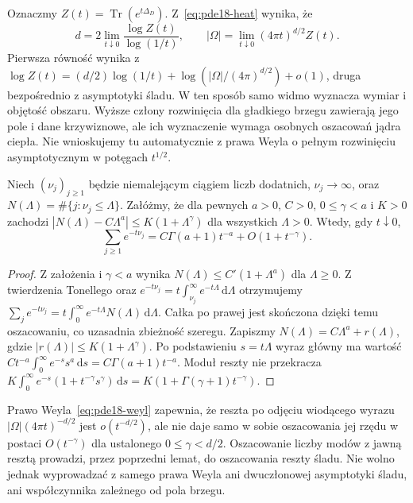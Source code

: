 \begin{uwaga}
Oznaczmy $Z(t)=\operatorname{Tr}(e^{t\Delta_D})$.
Z~\eqref{eq:pde18-heat} wynika, że
\[
 d=2\lim_{t\downarrow0}\frac{\log Z(t)}{\log(1/t)},
 \qquad
 |\Omega|=\lim_{t\downarrow0}(4\pi t)^{d/2}Z(t).
\]
Pierwsza równość wynika z
$\log Z(t)=(d/2)\log(1/t)+
\log(|\Omega|/(4\pi)^{d/2})+o(1)$,
druga bezpośrednio z asymptotyki śladu.
W ten sposób samo widmo wyznacza wymiar i objętość obszaru. Wyższe człony rozwinięcia dla gładkiego
brzegu zawierają jego pole i dane krzywiznowe, ale ich
wyznaczenie wymaga osobnych oszacowań jądra ciepła.
Nie wnioskujemy tu automatycznie z prawa Weyla o pełnym
rozwinięciu asymptotycznym w potęgach $t^{1/2}$.
\end{uwaga}


\begin{lemat}
\label{lem:pde18-abel}
Niech $(\nu_j)_{j\ge1}$ będzie niemalejącym ciągiem
liczb dodatnich, $\nu_j\to\infty$, oraz
$N(\Lambda)=\#\{j:\nu_j\le\Lambda\}$. Załóżmy, że dla
pewnych $a>0$, $C>0$, $0\le\gamma<a$ i $K>0$ zachodzi
$|N(\Lambda)-C\Lambda^a|\le K(1+\Lambda^\gamma)$
dla wszystkich $\Lambda>0$. Wtedy, gdy $t\downarrow0$,
\[
 \sum_{j\ge1}e^{-t\nu_j}
 =C\Gamma(a+1)t^{-a}+O(1+t^{-\gamma}).
\]
\end{lemat}
\begin{proof}
Z założenia i $\gamma<a$ wynika
$N(\Lambda)\le C'(1+\Lambda^a)$ dla $\Lambda\ge0$.
Z twierdzenia Tonellego oraz
$e^{-t\nu_j}=t\int_{\nu_j}^\infty e^{-t\Lambda}
\,\mathrm d\Lambda$ otrzymujemy
$\sum_j e^{-t\nu_j}=t\int_0^\infty e^{-t\Lambda}
N(\Lambda)\,\mathrm d\Lambda$.
Całka po prawej jest skończona dzięki temu oszacowaniu,
co uzasadnia zbieżność szeregu.
Zapiszmy $N(\Lambda)=C\Lambda^a+r(\Lambda)$,
gdzie $|r(\Lambda)|\le K(1+\Lambda^\gamma)$.
Po podstawieniu $s=t\Lambda$ wyraz główny ma wartość
$C t^{-a}\int_0^\infty e^{-s}s^a\,\mathrm ds
=C\Gamma(a+1)t^{-a}$. Moduł reszty nie przekracza
$K\int_0^\infty e^{-s}(1+t^{-\gamma}s^\gamma)
\,\mathrm ds=K(1+\Gamma(\gamma+1)t^{-\gamma})$.
\end{proof}

\begin{uwaga}
Prawo Weyla~\eqref{eq:pde18-weyl} zapewnia, że reszta
po odjęciu wiodącego wyrazu
$|\Omega|(4\pi t)^{-d/2}$ jest $o(t^{-d/2})$,
ale nie daje samo w sobie oszacowania jej rzędu
w postaci $O(t^{-\gamma})$ dla ustalonego $0\le\gamma<d/2$. Oszacowanie liczby modów z jawną
resztą prowadzi, przez poprzedni lemat, do oszacowania
reszty śladu. Nie wolno jednak wyprowadzać z samego prawa
Weyla ani dwuczłonowej asymptotyki śladu, ani współczynnika
zależnego od pola brzegu.
\end{uwaga}

